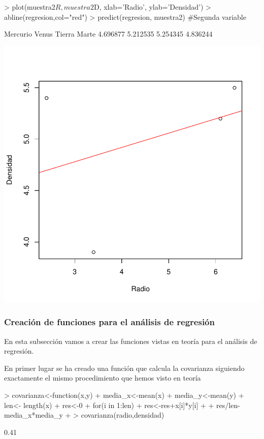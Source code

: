 \documentclass [a4paper] {article}
\begin{document}
\begin{Schunk}
\begin{Sinput}
> plot(muestra2$R, muestra2$D, xlab='Radio', ylab='Densidad')
> abline(regresion,col="red")
> predict(regresion, muestra2) #Segunda variable
\end{Sinput}
\begin{Soutput}
Mercurio    Venus   Tierra    Marte 
4.696877 5.212535 5.254345 4.836244 
\end{Soutput}
\end{Schunk}
\includegraphics{Memoria-Figura 11}

\subsubsection{Creación de funciones para el análisis de regresión}

En esta subsección vamos a crear las funciones vistas en teoría para el análisis de regresión.

En primer lugar se ha creado una función que calcula la covarianza siguiendo exactamente el mismo procedimiento
que hemos visto en teoría

\begin{Schunk}
\begin{Sinput}
> covarianza<-function(x,y) {
+ 	media_x<-mean(x)
+ 	media_y<-mean(y)
+ 	len<- length(x)
+ 	res<-0
+ 	for(i in 1:len){
+ 		res<-res+x[i]*y[i]
+ 	}
+ 	res/len-media_x*media_y
+ }
> covarianza(radio,densidad)
\end{Sinput}
\begin{Soutput}
[1] 0.41
\end{Soutput}
\end{Schunk}
\end{document}

